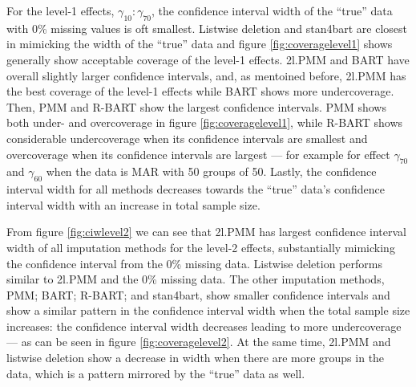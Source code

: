 \documentclass[10pt, a4paper, titlepage]{article}
\begin{document}

For the level-1 effects, $\gamma_{10}:\gamma_{70}$, the confidence interval width of the ``true'' data with 0\% missing values is oft smallest. Listwise deletion and stan4bart are closest in mimicking the width of the ``true'' data and figure \ref{fig:coveragelevel1} shows generally show acceptable coverage of the level-1 effects. 2l.PMM and BART have overall slightly larger confidence intervals, and, as mentoined before, 2l.PMM has the best coverage of the level-1 effects while BART shows more undercoverage. Then, PMM and R-BART show the largest confidence intervals. PMM shows both under- and overcoverage in figure \ref{fig:coveragelevel1}, while R-BART shows considerable undercoverage when its confidence intervals are smallest and overcoverage when its confidence intervals are largest --- for example for effect $\gamma_{70}$ and $\gamma_{60}$ when the data is MAR with 50 groups of 50. Lastly, the confidence interval width for all methods decreases towards the ``true'' data's confidence interval width with an increase in total sample size. 


From figure \ref{fig:ciwlevel2} we can see that 2l.PMM has largest confidence interval width of all imputation methods for the level-2 effects, substantially mimicking the confidence interval from the 0\% missing data. Listwise deletion performs similar to 2l.PMM and the 0\% missing data. The other imputation methods, PMM; BART; R-BART; and stan4bart, show smaller confidence intervals and show a similar pattern in the confidence interval width when the total sample size increases: the confidence interval width decreases leading to more undercoverage --- as can be seen in figure \ref{fig:coveragelevel2}. At the same time, 2l.PMM and listwise deletion show a decrease in width when there are more groups in the data, which is a pattern mirrored by the ``true'' data as well. 

\end{document}
